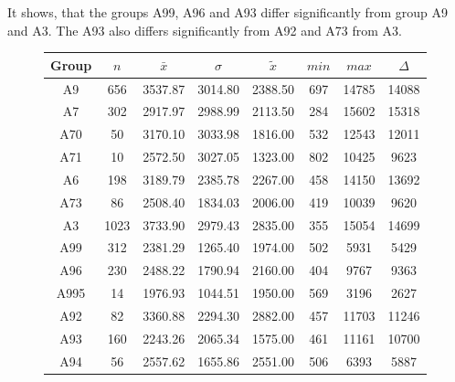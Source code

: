 It shows, that the groups A99, A96 and A93 differ significantly from group A9 and A3. The A93 also differs significantly from A92 and A73 from A3.
\begin{figure}[ht!]
	\centering
	\begin{minipage}{0.5\textwidth}
		\tiny
		\setlength{\tabcolsep}{4pt}
		\centering
		\begin{tabular}{c|c|c|c|c|c|c|c}
			\toprule
			Group & $n$ & $\bar{x}$ & $\sigma$ & $\tilde{x}$ & $min$ & $max$ & $\Delta$ \\
			\midrule
			A9   & 656  & 3537.87 & 3014.80 & 2388.50 & 697 & 14785 & 14088 \\ 
			A7   & 302  & 2917.97 & 2988.99 & 2113.50 & 284 & 15602 & 15318 \\ 
			A70  & 50   & 3170.10 & 3033.98 & 1816.00 & 532 & 12543 & 12011 \\ 
			A71  & 10   & 2572.50 & 3027.05 & 1323.00 & 802 & 10425 & 9623  \\ 
			A6   & 198  & 3189.79 & 2385.78 & 2267.00 & 458 & 14150 & 13692 \\
			A73  & 86   & 2508.40 & 1834.03 & 2006.00 & 419 & 10039 & 9620  \\ 
			A3   & 1023 & 3733.90 & 2979.43 & 2835.00 & 355 & 15054 & 14699 \\ 
			A99  & 312  & 2381.29 & 1265.40 & 1974.00 & 502 & 5931  & 5429  \\ 
			A96  & 230  & 2488.22 & 1790.94 & 2160.00 & 404 & 9767  & 9363  \\ 
			A995 & 14   & 1976.93 & 1044.51 & 1950.00 & 569 & 3196  & 2627  \\ 
			A92  & 82   & 3360.88 & 2294.30 & 2882.00 & 457 & 11703 & 11246 \\ 
			A93  & 160  & 2243.26 & 2065.34 & 1575.00 & 461 & 11161 & 10700 \\  
			A94  & 56   & 2557.62 & 1655.86 & 2551.00 & 506 & 6393  & 5887  \\ 
			\bottomrule
		\end{tabular}
		\label{tbl:descriptives_arbis_matched_Strasse_SAvg}
	\end{minipage}%
	\begin{minipage}{0.55\textwidth}
\end{minipage}
\end{figure}
